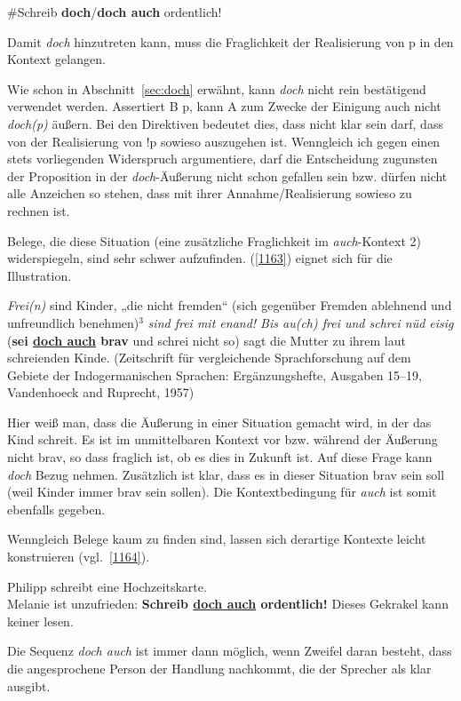 \begin{exe}
	\ex\label{1162} 
	\#Schreib \textbf{doch}/\textbf{doch auch} ordentlich!
\end{exe}
Damit \textit{doch} hinzutreten kann, muss die Fraglichkeit der Realisierung von p in den Kontext gelangen.

Wie schon in Abschnitt~\ref{sec:doch} erwähnt, kann \textit{doch} nicht rein bestätigend verwendet werden. Assertiert B p, kann A zum Zwecke der Einigung auch nicht \textit{doch(p)} äußern. Bei den Direktiven bedeutet dies, dass nicht klar sein darf, dass von der Realisierung von !p sowieso auszugehen ist. Wenngleich ich gegen einen stets vorliegenden Widerspruch argumentiere, darf die Entscheidung zugunsten der Proposition in der \textit{doch}-Äußerung nicht schon gefallen sein bzw. dürfen nicht alle Anzeichen so stehen, dass mit ihrer Annahme/Realisierung sowieso zu rechnen ist.

Belege, die diese Situation (eine zusätzliche Fraglichkeit im \textit{auch}-Kontext 2) widerspiegeln, sind sehr schwer aufzufinden. (\ref{1163}) eignet sich für die Illustration.

\begin{exe}
	\ex\label{1163} 
	\textit{Frei(n)} sind Kinder, „die nicht fremden“ (sich gegenüber Fremden ablehnend und unfreundlich benehmen)$^{3}$ \textit{sind frei mit enand! 	Bis au(ch) frei und schrei nüd eisig} (\textbf{sei \ul{doch auch} brav} und schrei nicht so) sagt die Mutter zu ihrem laut schreienden Kinde.
	\newline
	(Zeitschrift für vergleichende Sprachforschung auf dem Gebiete der Indogermanischen Sprachen: Ergänzungshefte, Ausgaben 15–19, Vandenhoeck and Ruprecht, 1957)
\end{exe}
Hier weiß man, dass die Äußerung in einer Situation gemacht wird, in der das Kind schreit. Es ist im unmittelbaren Kontext vor bzw. während der Äußerung nicht brav, so dass fraglich ist, ob es dies in Zukunft ist. Auf diese Frage kann \textit{doch} Bezug nehmen. Zusätzlich ist klar, dass es in dieser Situation brav sein soll (weil Kinder immer brav sein sollen). Die Kontextbedingung für \textit{auch} ist somit ebenfalls gegeben.

Wenngleich Belege kaum zu finden sind, lassen sich derartige Kontexte leicht konstruieren (vgl.\ \ref{1164}).

\begin{exe}
	\ex\label{1164} 
	Philipp schreibt eine Hochzeitskarte.\\
	Melanie ist unzufrieden: \textbf{Schreib \ul{doch auch} ordentlich!} Dieses Gekrakel kann keiner lesen.
\end{exe}
Die Sequenz \textit{doch auch} ist immer dann möglich, wenn Zweifel daran besteht, dass die angesprochene Person der Handlung nachkommt, die der Sprecher als klar ausgibt.

